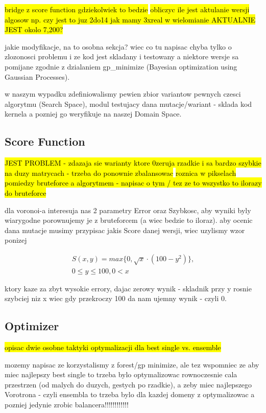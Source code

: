 \documentclass[format=acmsmall,screen,review,authordraft,nonacm]{acmart}
\begin{document}
\hl{bridge z score function gdziekolwiek to bedzie}
\hl{obliczyc ile jest aktulanie wersji algosow np. czy jest to juz 2do14 jak
mamy 3xreal w wielomianie AKTUALNIE JEST okolo 7,200?}

jakie modyfikacje, na to osobna sekcja? wiec co tu napisac
chyba tylko o zlozonosci problemu i ze kod jest skladany i testowany a niektore
wersje sa pomijane zgodnie z dzialaniem gp\_minimize (Bayesian optimization
using Gaussian Processes).

w naszym wypadku zdefiniowalismy pewien zbior variantow pewnych czesci
algorytmu (Search Space), modul testujacy dana mutacje/wariant - sklada kod kernela a pozniej go weryfikuje na naszej Domain Space.

\subsection{Score Function} %

\hl{JEST PROBLEM - zdazaja sie warianty ktore 0zeruja rzadkie i sa bardzo
szybkie na duzy matrycach - trzeba do ponownie zbalansowac}
\hl{roznica w pikselach pomiedzy bruteforce a algorytmem - napisac o tym / tez
ze to wszystko to ilorazy do bruteforce}

dla voronoi-a interesuja nas 2 parametry Error oraz Szybkosc, aby wyniki byly
wiarygodne porownujemy je z bruteforcem (a wiec bedzie to iloraz).
aby ocenic dana mutacje musimy przypisac jakis Score danej wersji, wiec uzylismy
wzor ponizej

\begin{align}
	S(x,y) = max\{0, \sqrt{x} \cdot (100-y^{2})\}, \\
0 \leq y \leq 100, 0 < x
\end{align}

ktory kaze za zbyt wysokie errory, dajac zerowy wynik - skladnik przy y rosnie
szybciej niz x wiec gdy przekroczy 100 da nam ujemny wynik - czyli 0.

\subsection{Optimizer} %

\hl{opisac dwie osobne taktyki optymalizacji dla best single vs. ensemble}

mozemy napisac ze korzystalismy z forest/gp minimize, ale tez wspomniec ze aby
miec najlepszy best single to trzeba bylo optymalizowac rownoczesnie cala
przestrzen (od malych do duzych, gestych po rzadkie), a zeby miec najlepszego
Vorotrona - czyli ensembla to trzeba bylo dla kazdej domeny z optymalizowac a
pozniej jedynie zrobic balancera!!!!!!!!!!!!
\end{document}
